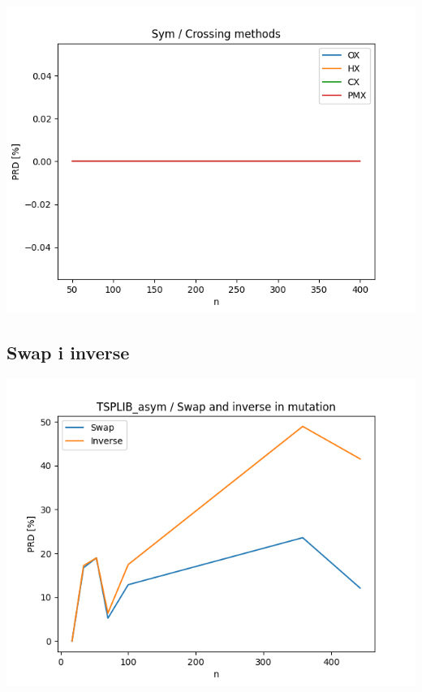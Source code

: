 \documentclass{article}
\begin{document}
\begin{center}
\includegraphics[width=\textwidth, 
                   height = 0.4\textheight, 
                   keepaspectratio]
                  {plots/sym_5_crossing} 
\end{center}


\subsection{Swap i inverse}

\begin{center}
\includegraphics[width=\textwidth, 
                   height = 0.4\textheight, 
                   keepaspectratio]
                  {plots/tsplib_asym_6_swap_inverse} 
\end{center}
\end{document}
